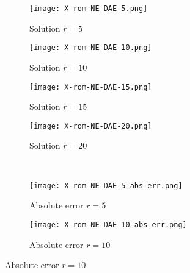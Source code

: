\begin{figure}[!htb]
     \begin{center}
        \begin{subfigure}[b]{0.23\textwidth}
       \begin{center}
        \texttt{[image: X-rom-NE-DAE-5.png]}
       \end{center}
            \caption{Solution $r = 5$}
        \end{subfigure}
   \begin{subfigure}[b]{0.23\textwidth}
        \begin{center}
            \texttt{[image: X-rom-NE-DAE-10.png]}
        \end{center}
            \caption{Solution $r = 10$}
        \end{subfigure}
   \begin{subfigure}[b]{0.23\textwidth}
            \begin{center}
                \texttt{[image: X-rom-NE-DAE-15.png]}
            \end{center}
            \caption{Solution $r = 15$}
        \end{subfigure}
   \begin{subfigure}[b]{0.23\textwidth}
            \begin{center}
                \texttt{[image: X-rom-NE-DAE-20.png]}
            \end{center}
            \caption{Solution $r = 20$}
        \end{subfigure}\\  
        \begin{subfigure}[b]{0.23\textwidth}
            \begin{center}
                \texttt{[image: X-rom-NE-DAE-5-abs-err.png]}
            \end{center}
            \caption{Absolute error $r = 5$}
        \end{subfigure}  
        \begin{subfigure}[b]{0.23\textwidth}
            \begin{center}
                \texttt{[image: X-rom-NE-DAE-10-abs-err.png]}
            \end{center}
            \caption{Absolute error $r = 10$}

\end{subfigure}
\end{center}
\end{figure}
